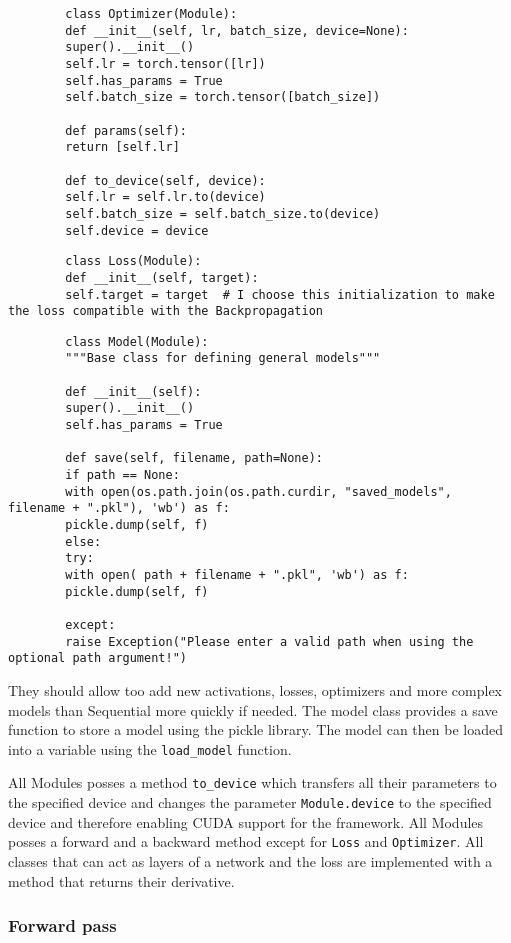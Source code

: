 \documentclass[11pt,english]{article}
\begin{document}
	\begin{lstlisting}
		class Optimizer(Module):
		def __init__(self, lr, batch_size, device=None):
		super().__init__()
		self.lr = torch.tensor([lr])
		self.has_params = True
		self.batch_size = torch.tensor([batch_size])
		
		def params(self):
		return [self.lr]
		
		def to_device(self, device):
		self.lr = self.lr.to(device)
		self.batch_size = self.batch_size.to(device)
		self.device = device
	\end{lstlisting}	
	
	\begin{lstlisting}
		class Loss(Module):
		def __init__(self, target):
		self.target = target  # I choose this initialization to make the loss compatible with the Backpropagation 
	\end{lstlisting} 
	
	\begin{lstlisting}
		class Model(Module):
		"""Base class for defining general models"""
		
		def __init__(self):
		super().__init__()
		self.has_params = True
		
		def save(self, filename, path=None):
		if path == None:
		with open(os.path.join(os.path.curdir, "saved_models", filename + ".pkl"), 'wb') as f:
		pickle.dump(self, f)
		else:
		try:
		with open( path + filename + ".pkl", 'wb') as f:
		pickle.dump(self, f)
		
		except:
		raise Exception("Please enter a valid path when using the optional path argument!")
	\end{lstlisting}
	
	They should allow too add new activations, losses, optimizers and more complex models than Sequential more quickly if needed. The model class provides a save function to store a model using the pickle library. The model can then be loaded into a variable using the \lstinline|load_model| function.
	
	All Modules posses a method \lstinline|to_device| which transfers all their parameters to the specified device and changes the parameter \lstinline|Module.device| to the specified device and therefore enabling CUDA support for the framework. All Modules posses a forward and a backward method except for \lstinline|Loss| and \lstinline|Optimizer|. All classes that can act as layers of a network and the loss are implemented with a method that returns their derivative.
	
	\subsubsection*{Forward pass}
	
\end{document}
